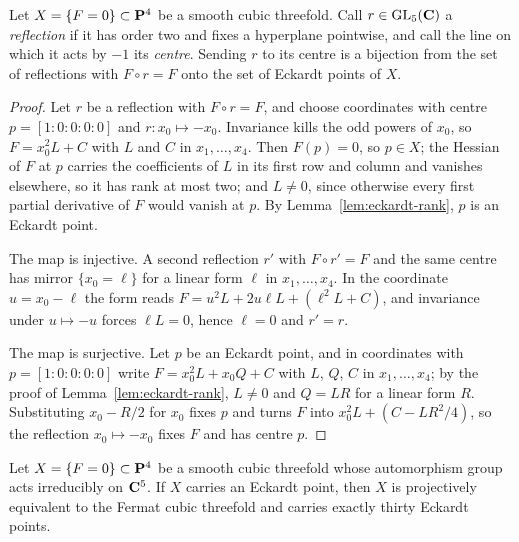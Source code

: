 \begin{lemma}
\label{lem:eckardt-involution}
%
%
Let \(X=\{F=0\}\subset\mathbf P^4\) be a smooth cubic threefold.  Call
\(r\in\operatorname{GL}_5(\mathbf C)\) a \emph{reflection} if it has order two and
fixes a hyperplane pointwise, and call the line on which it acts by \(-1\) its
\emph{centre}.  Sending \(r\) to its centre is a bijection from the set of
reflections with \(F\circ r=F\) onto the set of Eckardt points of \(X\).
\end{lemma}

\begin{proof}
Let \(r\) be a reflection with \(F\circ r=F\), and choose coordinates with
centre \(p=[1:0:0:0:0]\) and \(r:x_0\mapsto-x_0\).  Invariance kills the odd
powers of \(x_0\), so \(F=x_0^2L+C\) with \(L\) and \(C\) in
\(x_1,\dots,x_4\).  Then \(F(p)=0\), so \(p\in X\); the Hessian of \(F\) at
\(p\) carries the coefficients of \(L\) in its first row and column and
vanishes elsewhere, so it has rank at most two; and \(L\ne0\), since
otherwise every first partial derivative of \(F\) would vanish at \(p\).  By
Lemma~\ref{lem:eckardt-rank}, \(p\) is an Eckardt point.

The map is injective.  A second reflection \(r'\) with \(F\circ r'=F\) and the
same centre has mirror \(\{x_0=\ell\}\) for a linear form \(\ell\) in
\(x_1,\dots,x_4\).  In the coordinate \(u=x_0-\ell\) the form reads
\(F=u^2L+2u\ell L+(\ell^2L+C)\), and invariance under \(u\mapsto-u\) forces
\(\ell L=0\), hence \(\ell=0\) and \(r'=r\).

The map is surjective.  Let \(p\) be an Eckardt point, and in coordinates with
\(p=[1:0:0:0:0]\) write \(F=x_0^2L+x_0Q+C\) with \(L\), \(Q\), \(C\) in
\(x_1,\dots,x_4\); by the proof of Lemma~\ref{lem:eckardt-rank}, \(L\ne0\) and
\(Q=LR\) for a linear form \(R\).  Substituting \(x_0-R/2\) for \(x_0\) fixes
\(p\) and turns \(F\) into \(x_0^2L+(C-LR^2/4)\), so the reflection
\(x_0\mapsto-x_0\) fixes \(F\) and has centre \(p\).
\end{proof}

\begin{proposition}
\label{prop:eckardt-reflection-group}
%
%
%
Let \(X=\{F=0\}\subset\mathbf P^4\) be a smooth cubic threefold whose automorphism
group acts irreducibly on \(\mathbf C^5\).  If \(X\) carries an Eckardt point, then
\(X\) is projectively equivalent to the Fermat cubic threefold and carries
exactly thirty Eckardt points.
\end{proposition}

